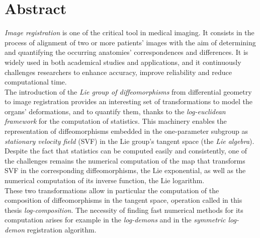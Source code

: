 
\qquad
\pagestyle{empty}
\newpage


\section*{Abstract}

\emph{Image registration} is one of the critical tool in medical imaging. It consists in the process of alignment of two or more patients' images with the aim of determining and quantifying the occurring anatomies' correspondences and differences.
It is widely used in both academical studies and applications, and it continuously challenges researchers to enhance accuracy, improve reliability and reduce computational time.\\

The introduction of the \emph{Lie group of diffeomorphisms} from differential geometry to image registration provides an interesting set of transformations to model the organs' deformations, and to quantify them, thanks to the \emph{log-euclidean framework} for the computation of statistics.
This machinery enables the representation of diffeomorphisms embedded in the one-parameter subgroup as \emph{stationary velocity field} (SVF) in the Lie group's tangent space (the \emph{Lie algebra}). Despite the fact that statistics can be computed easily and consistently, one of the challenges remains the numerical computation of the map that transforms SVF in the corresponding diffeomorphisms, the Lie exponential, as well as the numerical computation of its inverse function, the Lie logarithm. \\

These two transformations allow in particular the computation of the composition of diffeomorphisms in the tangent space, operation called in this thesis \emph{log-composition}. 
The necessity of finding fast numerical methods for its computation arises for example in the \emph{log-demons} and in the \emph{symmetric log-demon} registration algorithm.\\

